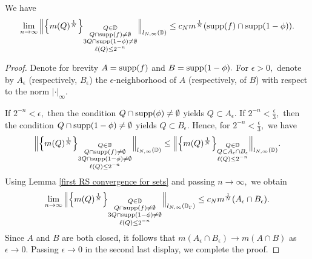 \documentclass{amsart}
\begin{document}
\begin{lemma}\label{first RS extra convergence for sets} We have
$$\lim_{n\to\infty}\Big\|\Big\{m(Q)^{\frac1N}\Big\}_{\substack{Q\in\mathbb{D}\\ Q\cap {\rm supp}(f)\neq\emptyset\\ 3Q\cap {\rm supp}(1-\phi)\neq\emptyset\\ \ell(Q)\leq 2^{-n}}}\Big\|_{l_{N,\infty}(\mathbb{D})}\leq c_Nm^{\frac1N}({\rm supp}(f)\cap{\rm supp}(1-\phi)).$$
\end{lemma}
\begin{proof} Denote for brevity $A={\rm supp}(f)$ and $B={\rm supp}(1-\phi).$ For $\epsilon>0,$ denote by $A_{\epsilon}$ (respectively, $B_{\epsilon}$) the $\epsilon$-neighborhood of $A$ (respectively, of $B$) with respect to the norm $|\cdot|_{\infty}.$

If $2^{-n}<\epsilon,$ then the condition $Q\cap{\rm supp}(\phi)\neq\emptyset$ yields $Q\subset A_{\epsilon}.$ If $2^{-n}<\frac{\epsilon}{3},$ then the condition $Q\cap{\rm supp}(1-\phi)\neq\emptyset$ yields $Q\subset B_{\epsilon}.$ Hence, for $2^{-n}<\frac{\epsilon}{3},$ we have
$$\Big\|\Big\{m(Q)^{\frac1N}\Big\}_{\substack{Q\in\mathbb{D}\\ Q\cap {\rm supp}(f)\neq\emptyset\\ 3Q\cap {\rm supp}(1-\phi)\neq\emptyset\\ \ell(Q)\leq 2^{-n}}}\Big\|_{l_{N,\infty}(\mathbb{D})}\leq \Big\|\Big\{m(Q)^{\frac1N}\Big\}_{\substack{Q\in\mathbb{D}\\ Q\subset A_{\epsilon}\cap B_{\epsilon}\\ \ell(Q)\leq 2^{-n}}}\Big\|_{l_{N,\infty}(\mathbb{D})}.$$
Using Lemma \ref{first RS convergence for sets} and passing $n\to\infty,$ we obtain
$$\lim_{n\to\infty}\Big\|\Big\{m(Q)^{\frac1N}\Big\}_{\substack{Q\in\mathbb{D}\\ Q\cap {\rm supp}(f)\neq\emptyset\\ 3Q\cap {\rm supp}(1-\phi)\neq\emptyset\\ \ell(Q)\leq 2^{-n}}}\Big\|_{l_{N,\infty}(\mathbb{D}_{\Gamma})}\leq c_Nm^{\frac1N}(A_{\epsilon}\cap B_{\epsilon}).$$
Since $A$ and $B$ are both closed, it follows that $m(A_{\epsilon}\cap B_{\epsilon})\to m(A\cap B)$ as $\epsilon\to0.$ Passing $\epsilon\to0$ in the second last display, we complete the proof.
\end{proof}
\end{document}
